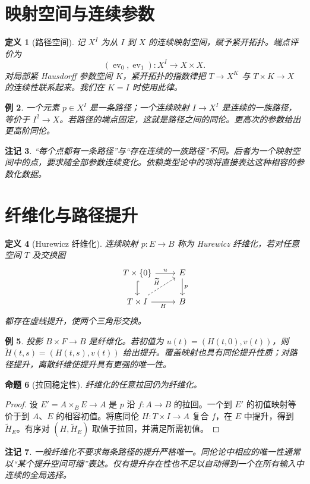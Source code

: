 \documentclass[12pt,oneside,openany,fontset=none]{ctexbook}
\theoremstyle{cn}
\newtheorem{definition}{定义}[chapter]
\newtheorem{example}[definition]{例}
\newtheorem{proposition}[definition]{命题}
\newtheorem{remark}[definition]{注记}
\numberwithin{equation}{chapter}
\newcommand{\ev}{\operatorname{ev}}
\begin{document}
\section{映射空间与连续参数}
\begin{definition}[路径空间]
记 $X^I$ 为从 $I$ 到 $X$ 的连续映射空间，赋予紧开拓扑。端点评价为
\[
(\ev_0,\ev_1):X^I\longrightarrow X\times X.
\]
对局部紧 Hausdorff 参数空间 $K$，紧开拓扑的指数律把 $T\to X^K$ 与 $T\times K\to X$ 的连续性联系起来。我们在 $K=I$ 时使用此律。
\end{definition}
\begin{example}
一个元素 $p\in X^I$ 是一条路径；一个连续映射 $I\to X^I$ 是连续的一族路径，等价于 $I^2\to X$。若路径的端点固定，这就是路径之间的同伦。更高次的参数给出更高阶同伦。
\end{example}
\begin{remark}
“每个点都有一条路径”与“存在连续的一族路径”不同。后者为一个映射空间中的点，要求随全部参数连续变化。依赖类型论中的项将直接表达这种相容的参数化数据。
\end{remark}

\section{纤维化与路径提升}
\begin{definition}[Hurewicz 纤维化]
连续映射 $p:E\to B$ 称为 Hurewicz 纤维化，若对任意空间 $T$ 及交换图
\[
\begin{tikzcd}
T\times\{0\}\ar[r,"u"]\ar[d,hook]&E\ar[d,"p"]\\
T\times I\ar[r,"H"']\ar[ur,dashed,"\widetilde H"]&B
\end{tikzcd}
\]
都存在虚线提升，使两个三角形交换。
\end{definition}
\begin{example}
投影 $B\times F\to B$ 是纤维化。若初值为 $u(t)=(H(t,0),v(t))$，则 $\widetilde H(t,s)=(H(t,s),v(t))$ 给出提升。覆盖映射也具有同伦提升性质；对路径提升，离散纤维使提升具有更强的唯一性。
\end{example}
\begin{proposition}[拉回稳定性]
纤维化的任意拉回仍为纤维化。
\end{proposition}
\begin{proof}
设 $E'=A\times_BE\to A$ 是 $p$ 沿 $f:A\to B$ 的拉回。一个到 $E'$ 的初值映射等价于到 $A$、$E$ 的相容初值。将底同伦 $H:T\times I\to A$ 复合 $f$，在 $E$ 中提升，得到 $\widetilde H_E$。有序对 $(H,\widetilde H_E)$ 取值于拉回，并满足所需初值。
\end{proof}
\begin{remark}
一般纤维化不要求每条路径的提升严格唯一。同伦论中相应的唯一性通常以“某个提升空间可缩”表达。仅有提升存在性也不足以自动得到一个在所有输入中连续的全局选择。
\end{remark}
\end{document}
